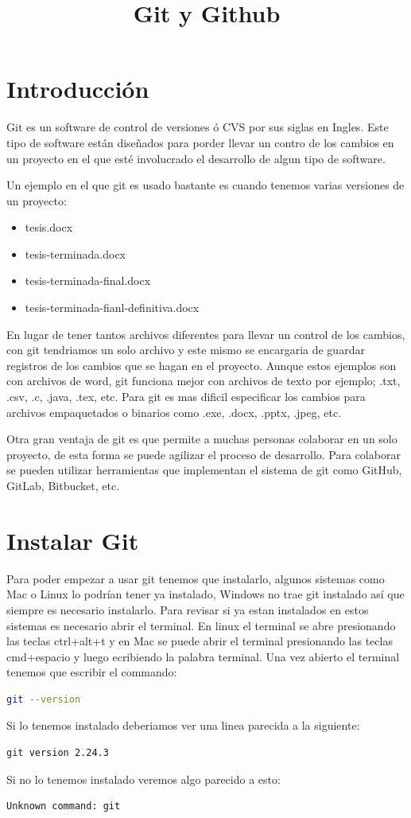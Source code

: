\documentclass[11pt, oneside]{article}
\title{Git y Github}
\begin{document}
\maketitle

\section{Introducción}
Git es un software de control de versiones ó CVS por sus siglas en Ingles. Este tipo de software están diseñados para porder llevar un contro de los cambios en un proyecto en el que esté involucrado el desarrollo de algun tipo de software.

Un ejemplo en el que git es usado bastante es cuando tenemos varias versiones de un proyecto:
\begin{itemize}
  \item tesis.docx
  \item tesis-terminada.docx
  \item tesis-terminada-final.docx
  \item tesis-terminada-fianl-definitiva.docx
\end{itemize}
En lugar de tener tantos archivos diferentes para llevar un control de los cambios, con git tendriamos un solo archivo y este mismo se encargaria de guardar registros de los cambios que se hagan en el proyecto. Aunque estos ejemplos son con archivos de word, git funciona mejor con archivos de texto por ejemplo; .txt, .csv, .c, .java, .tex, etc. Para git es mas dificil especificar los cambios para archivos empaquetados o binarios como .exe, .docx, .pptx, .jpeg, etc.

Otra gran ventaja de git es que permite a muchas personas colaborar en un solo proyecto, de esta forma se puede agilizar el proceso de desarrollo. Para colaborar se pueden utilizar herramientas que implementan el sistema de git como GitHub, GitLab, Bitbucket, etc.

\section{Instalar Git}
Para poder empezar a usar git tenemos que instalarlo, algunos sistemas como Mac o Linux lo podrían tener ya instalado, Windows no trae git instalado así que siempre es necesario instalarlo. Para revisar si ya estan instalados en estos sistemas es necesario abrir el terminal. En linux el terminal se abre presionando las teclas ctrl+alt+t y en Mac se puede abrir el terminal presionando las teclas cmd+espacio y luego ecribiendo la palabra terminal. Una vez abierto el terminal tenemos que escribir el commando:
\begin{lstlisting}[language=bash,caption={Comando para revisar versión de Git}]
git --version
\end{lstlisting}
Si lo tenemos instalado deberiamos ver una linea parecida a la siguiente:
\begin{lstlisting}[language=bash,caption={Versión de Git}]
git version 2.24.3 
\end{lstlisting}
Si no lo tenemos instalado veremos algo parecido a esto:
\begin{lstlisting}[language=bash,caption={Git no instalado}]
Unknown command: git
\end{lstlisting}
\end{document}
